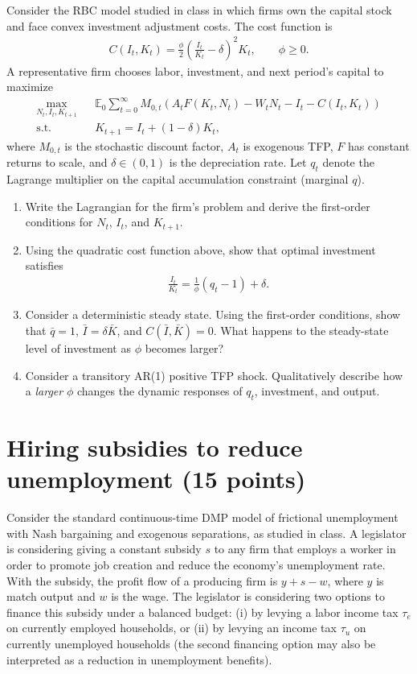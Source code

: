 \documentclass[11pt]{article}
\newcommand{\ben}{\begin{enumerate}}
\newcommand{\een}{\end{enumerate}}
\begin{document}
Consider the RBC model studied in class in which firms own the capital stock and face convex investment adjustment costs. The cost function is
\begin{eqnarray}
C(I_t,K_t)=\frac{\phi}{2}\left(\frac{I_t}{K_t}-\delta\right)^2 K_t, \qquad \phi\geq 0. \nonumber
\end{eqnarray}
A representative firm chooses labor, investment, and next period's capital to maximize
\begin{eqnarray}
\max_{N_t, I_t, K_{t+1}} && \mathbb{E}_0 \sum_{t=0}^{\infty} M_{0,t} \left(A_t F(K_t, N_t) - W_t N_t - I_t - C(I_t,K_t)\right) \nonumber \\
\text{s.t.} && K_{t+1} = I_t + (1-\delta)K_t, \nonumber
\end{eqnarray}
where $M_{0,t}$ is the stochastic discount factor, $A_t$ is exogenous TFP, $F$ has constant returns to scale, and $\delta\in(0,1)$ is the depreciation rate. Let $q_t$ denote the Lagrange multiplier on the capital accumulation constraint (marginal $q$).

\ben
\item Write the Lagrangian for the firm's problem and derive the first-order conditions for $N_t$, $I_t$, and $K_{t+1}$. 

\item Using the quadratic cost function above, show that optimal investment satisfies
\begin{eqnarray}
\frac{I_t}{K_t}=\frac{1}{\phi}(q_t-1)+\delta. \nonumber
\end{eqnarray}

\item Consider a deterministic steady state. Using the first-order conditions, show that $\bar q=1$, $\bar I=\delta\bar K$, and $C(\bar I,\bar K)=0$. What happens to the steady-state level of investment as $\phi$ becomes larger?

\item Consider a transitory AR(1) positive TFP shock. Qualitatively describe how a \emph{larger} $\phi$ changes the dynamic responses of $q_t$, investment, and output.
\een

\newpage

\section{Hiring subsidies to reduce unemployment (15 points)}

Consider the standard continuous-time DMP model of frictional unemployment with Nash bargaining and exogenous separations, as studied in class. A legislator is considering giving a constant subsidy $s$ to any firm that employs a worker in order to promote job creation and reduce the economy's unemployment rate. With the subsidy, the profit flow of a producing firm is $y+s-w$, where $y$ is match output and $w$ is the wage. The legislator is considering two options to finance this subsidy under a balanced budget: (i) by levying a labor income tax $\tau_e$ on currently employed households, or (ii) by levying an income tax $\tau_u$ on currently unemployed households (the second financing option may also be interpreted as a reduction in unemployment benefits).
\end{document}
